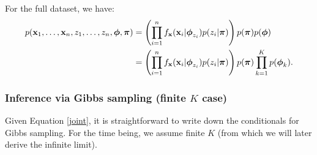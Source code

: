 \documentclass[12pt]{article}
\begin{document}
%
%



For the full dataset, we have:
\begin{align}
p({\bf x}_1,\ldots, {\bf x}_n,z_1, \ldots, z_n, \boldsymbol{\phi}, \boldsymbol{\pi}) &= \left(\prod_{i=1}^n f_{\bf x}({\bf x}_i | \boldsymbol{\phi}_{z_i})p(z_i | \boldsymbol{\pi})\right)p(\boldsymbol{\pi})p(\boldsymbol{\phi})\\
&= \left(\prod_{i=1}^n f_{\bf x}({\bf x}_i | \boldsymbol{\phi}_{z_i})p(z_i | \boldsymbol{\pi})\right)p(\boldsymbol{\pi})\prod_{k = 1}^K p(\boldsymbol{\phi}_k).\label{joint}
\end{align}

\subsubsection{Inference via Gibbs sampling (finite $K$ case)}
Given Equation \eqref{joint}, it is straightforward to write down the conditionals for Gibbs sampling.  For the time being, we assume finite $K$ (from which we will later derive the infinite limit).  
\end{document}
